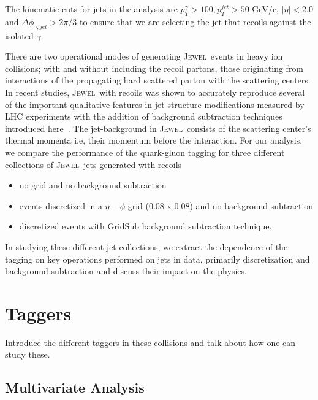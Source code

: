\documentclass[notoc]{JHEP3}
\newcommand{\jw}{\textsc{Jewel}~}
\begin{document}
The kinematic cuts for jets in the analysis are $p^{\gamma}_{T} > 100, p^{jet}_{T} > 50$ GeV/c, $|\eta| < 2.0$ and $\Delta \phi_{\gamma, jet} > 2\pi/3$ to ensure that we are selecting the jet that recoils against the isolated $\gamma$.

	There are two operational modes of generating \jw events in heavy ion collisions; with and without including the recoil partons, those originating from interactions of the propagating hard scattered parton with the scattering centers. In recent studies, \jw with recoils was shown to accurately reproduce several of the important qualitative features in jet structure modifications measured by LHC experiments with the addition of background subtraction techniques introduced here~\cite{}. The jet-background in \jw consists of the scattering center's thermal momenta i.e, their momentum before the interaction. For our analysis, we compare the performance of the quark-gluon tagging for three different collections of \jw jets generated with recoils
	\begin{itemize}
		\item no grid and no background subtraction
		\item events discretized in a $\eta-\phi$ grid (0.08 x 0.08) and no background subtraction
		\item discretized events with GridSub background subtraction technique.
	\end{itemize}
	In studying these different jet collections, we extract the dependence of the tagging on key operations performed on jets in data, primarily discretization and background subtraction and discuss their impact on the physics.

\section{Taggers}
\label{sec:tagger}

	Introduce the different taggers in these collisions and talk about how one can study these.

\subsection{Multivariate Analysis}
\label{sec:mva}
\end{document}

